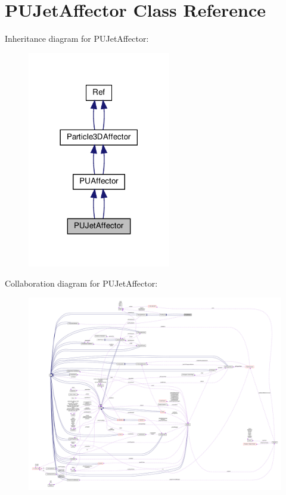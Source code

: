 \hypertarget{classPUJetAffector}{}\section{P\+U\+Jet\+Affector Class Reference}
\label{classPUJetAffector}


Inheritance diagram for P\+U\+Jet\+Affector\+:
\nopagebreak
\begin{figure}[H]
\begin{center}
\leavevmode
\includegraphics[width=177pt]{classPUJetAffector__inherit__graph}
\end{center}
\end{figure}


Collaboration diagram for P\+U\+Jet\+Affector\+:
\nopagebreak
\begin{figure}[H]
\begin{center}
\leavevmode
\includegraphics[width=350pt]{classPUJetAffector__coll__graph}
\end{center}
\end{figure}
